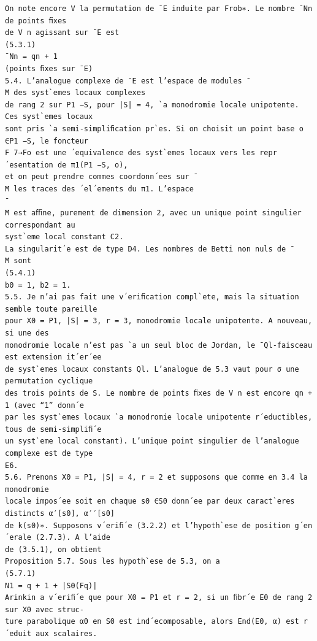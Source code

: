 \documentclass[11pt]{article}
\begin{document}
\begin{Verbatim}[breaklines=true,fontsize=\small]
On note encore V la permutation de ¯E induite par Frob∗. Le nombre ¯Nn de points ﬁxes
de V n agissant sur ¯E est
(5.3.1)
¯Nn = qn + 1
(points ﬁxes sur ¯E)
5.4. L’analogue complexe de ¯E est l’espace de modules ¯
M des syst`emes locaux complexes
de rang 2 sur P1 −S, pour |S| = 4, `a monodromie locale unipotente. Ces syst`emes locaux
sont pris `a semi-simpliﬁcation pr`es. Si on choisit un point base o ∈P1 −S, le foncteur
F 7→Fo est une ´equivalence des syst`emes locaux vers les repr´esentation de π1(P1 −S, o),
et on peut prendre commes coordonn´ees sur ¯
M les traces des ´el´ements du π1. L’espace
¯
M est aﬃne, purement de dimension 2, avec un unique point singulier correspondant au
syst`eme local constant C2.
La singularit´e est de type D4. Les nombres de Betti non nuls de ¯
M sont
(5.4.1)
b0 = 1, b2 = 1.
5.5. Je n’ai pas fait une v´eriﬁcation compl`ete, mais la situation semble toute pareille
pour X0 = P1, |S| = 3, r = 3, monodromie locale unipotente. A nouveau, si une des
monodromie locale n’est pas `a un seul bloc de Jordan, le ¯Ql-faisceau est extension it´er´ee
de syst`emes locaux constants Ql. L’analogue de 5.3 vaut pour σ une permutation cyclique
des trois points de S. Le nombre de points ﬁxes de V n est encore qn + 1 (avec “1” donn´e
par les syst`emes locaux `a monodromie locale unipotente r´eductibles, tous de semi-simpliﬁ´e
un syst`eme local constant). L’unique point singulier de l’analogue complexe est de type
E6.
5.6. Prenons X0 = P1, |S| = 4, r = 2 et supposons que comme en 3.4 la monodromie
locale impos´ee soit en chaque s0 ∈S0 donn´ee par deux caract`eres distincts α′[s0], α′′[s0]
de k(s0)∗. Supposons v´eriﬁ´e (3.2.2) et l’hypoth`ese de position g´en´erale (2.7.3). A l’aide
de (3.5.1), on obtient
Proposition 5.7. Sous les hypoth`ese de 5.3, on a
(5.7.1)
N1 = q + 1 + |S0(Fq)|
Arinkin a v´eriﬁ´e que pour X0 = P1 et r = 2, si un ﬁbr´e E0 de rang 2 sur X0 avec struc-
ture parabolique α0 en S0 est ind´ecomposable, alors End(E0, α) est r´eduit aux scalaires.


\end{Verbatim}
\end{document}
